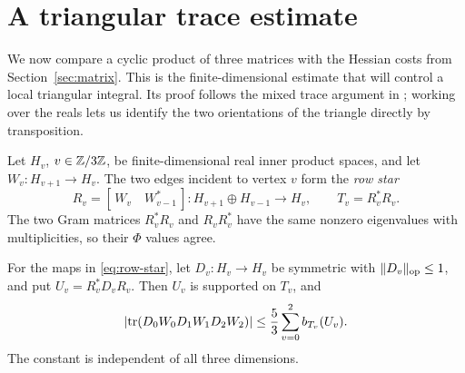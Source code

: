 \section{A triangular trace estimate}\label{sec:trace}

We now compare a cyclic product of three matrices with the Hessian
costs from Section~\ref{sec:matrix}. This is the finite-dimensional
estimate that will control a local triangular integral. Its proof
follows the mixed trace argument in \cite[Section~3]{OpenAI2026};
working over the reals lets us identify the two orientations of the
triangle directly by transposition.

Let \(H_v\), \(v\in\mathbb Z/3\mathbb Z\), be finite-dimensional real inner product
spaces, and let \(W_v:H_{v+1}\to H_v\). The two edges incident to
vertex \(v\) form the \emph{row star}
\begin{equation}\label{eq:row-star}
 R_v=[\,W_v\quad W_{v-1}^*\,]:
              H_{v+1}\oplus H_{v-1}\longrightarrow H_v,
 \qquad T_v=R_v^*R_v.
\end{equation}
The two Gram matrices \(R_v^*R_v\) and \(R_vR_v^*\) have the same
nonzero eigenvalues with multiplicities, so their \(\Phi\) values
agree.

\begin{proposition}\label{prop:trace}
For the maps in \eqref{eq:row-star}, let \(D_v:H_v\to H_v\) be
symmetric with \(\lVert D_v\rVert_{\mathrm{op}}\le1\), and put
\(U_v=R_v^*D_vR_v\). Then \(U_v\) is supported on \(T_v\), and
\begin{equation}\label{eq:trace}
 \lvert \operatorname{tr}(D_0W_0D_1W_1D_2W_2)\rvert
       \le\frac53\sum_{v=0}^2 b_{T_v}(U_v).
\end{equation}
The constant is independent of all three dimensions.
\end{proposition}


